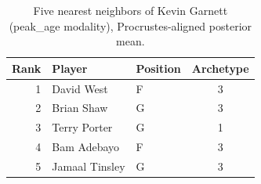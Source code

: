 \begin{table}[htbp]
  \centering\small
  \begin{tabular}{rllc}
    \toprule
    Rank & Player & Position & Archetype \\
    \midrule
    1 & David West & F & 3 \\
    2 & Brian Shaw & G & 3 \\
    3 & Terry Porter & G & 1 \\
    4 & Bam Adebayo & F & 3 \\
    5 & Jamaal Tinsley & G & 3 \\
    \bottomrule
  \end{tabular}
  \caption{Five nearest neighbors of Kevin Garnett (peak_age modality), Procrustes-aligned posterior mean.}
  \label{tab:Kevin_Garnett_neighbors_peak_age}
\end{table}

